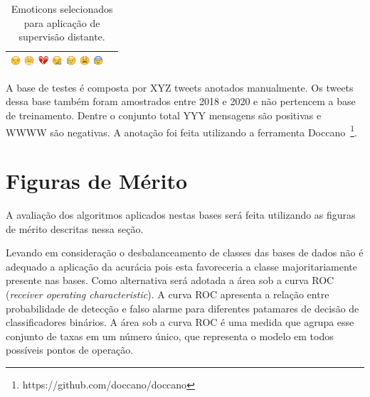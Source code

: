 \begin{table}[h]
\begin{center}
\begin{tabular}{| l | c |}
            \includegraphics[height=1em]{images/emojis/1F612}
            \includegraphics[height=1em]{images/emojis/1F624}
            \includegraphics[height=1em]{images/emojis/1F494}
            \includegraphics[height=1em]{images/emojis/1F62A}
            \includegraphics[height=1em]{images/emojis/1F625}
            \includegraphics[height=1em]{images/emojis/1F62B}
            \includegraphics[height=1em]{images/emojis/1F630}
        \\ \hline
        \end{tabular}
        \caption{Emoticons selecionados para aplicação de supervisão distante.}
        \label{tab:emoticons}
    \end{center}
\end{table}

A base de testes é composta por XYZ tweets anotados manualmente.
Os tweets dessa base também foram amostrados entre 2018 e 2020 e não pertencem a
base de treinamento.
Dentre o conjunto total YYY mensagens são positivas e WWWW são negativas.
A anotação foi feita utilizando a ferramenta
Doccano~\footnote{https://github.com/doccano/doccano}.

\section{Figuras de Mérito}

A avaliação dos algoritmos aplicados nestas bases será feita utilizando as figuras
de mérito descritas nessa seção.

Levando em consideração o desbalanceamento de classes das bases de dados não é
adequado a aplicação da acurácia pois esta favoreceria a classe majoritariamente
presente nas bases.
Como alternativa será adotada a área sob a curva ROC (\textit{receiver operating
characteristic}).
A curva ROC apresenta a relação entre probabilidade de detecção e falso alarme
para diferentes patamares de decisão de classificadores binários.
A área sob a curva ROC é uma medida que agrupa esse conjunto de taxas em um
número único, que representa o modelo em todos possíveis pontos de operação.

